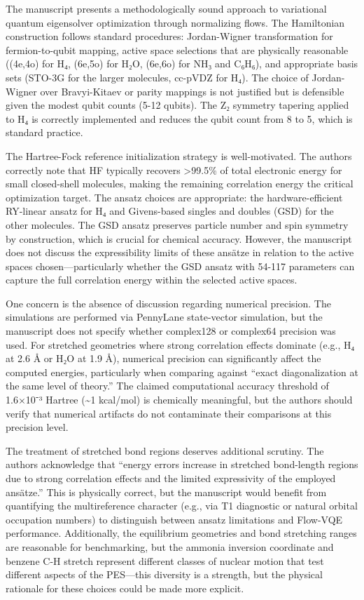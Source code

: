 \documentclass[10pt,letterpaper]{article}
\begin{document}
The manuscript presents a methodologically sound approach to variational quantum eigensolver optimization through normalizing flows. The Hamiltonian construction follows standard procedures: Jordan-Wigner transformation for fermion-to-qubit mapping, active space selections that are physically reasonable ((4e,4o) for H₄, (6e,5o) for H₂O, (6e,6o) for NH₃ and C₆H₆), and appropriate basis sets (STO-3G for the larger molecules, cc-pVDZ for H₄). The choice of Jordan-Wigner over Bravyi-Kitaev or parity mappings is not justified but is defensible given the modest qubit counts (5-12 qubits). The Z₂ symmetry tapering applied to H₄ is correctly implemented and reduces the qubit count from 8 to 5, which is standard practice.

The Hartree-Fock reference initialization strategy is well-motivated. The authors correctly note that HF typically recovers \textgreater99.5\% of total electronic energy for small closed-shell molecules, making the remaining correlation energy the critical optimization target. The ansatz choices are appropriate: the hardware-efficient RY-linear ansatz for H₄ and Givens-based singles and doubles (GSD) for the other molecules. The GSD ansatz preserves particle number and spin symmetry by construction, which is crucial for chemical accuracy. However, the manuscript does not discuss the expressibility limits of these ansätze in relation to the active spaces chosen---particularly whether the GSD ansatz with 54-117 parameters can capture the full correlation energy within the selected active spaces.

One concern is the absence of discussion regarding numerical precision. The simulations are performed via PennyLane state-vector simulation, but the manuscript does not specify whether complex128 or complex64 precision was used. For stretched geometries where strong correlation effects dominate (e.g., H₄ at 2.6 Å or H₂O at 1.9 Å), numerical precision can significantly affect the computed energies, particularly when comparing against ``exact diagonalization at the same level of theory.'' The claimed computational accuracy threshold of 1.6×10⁻³ Hartree (\textasciitilde1 kcal/mol) is chemically meaningful, but the authors should verify that numerical artifacts do not contaminate their comparisons at this precision level.

The treatment of stretched bond regions deserves additional scrutiny. The authors acknowledge that ``energy errors increase in stretched bond-length regions due to strong correlation effects and the limited expressivity of the employed ansätze.'' This is physically correct, but the manuscript would benefit from quantifying the multireference character (e.g., via T1 diagnostic or natural orbital occupation numbers) to distinguish between ansatz limitations and Flow-VQE performance. Additionally, the equilibrium geometries and bond stretching ranges are reasonable for benchmarking, but the ammonia inversion coordinate and benzene C-H stretch represent different classes of nuclear motion that test different aspects of the PES---this diversity is a strength, but the physical rationale for these choices could be made more explicit.
\end{document}
